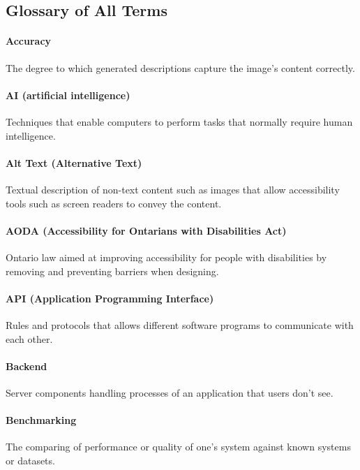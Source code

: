 \documentclass[12pt, titlepage]{article}
\begin{document}
\subsection{Glossary of All Terms}

\paragraph*{Accuracy}
The degree to which generated descriptions capture the image’s
content correctly.

\paragraph*{AI (artificial intelligence)}
Techniques that enable computers to perform tasks that normally
require human intelligence.

\paragraph*{Alt Text (Alternative Text)}
Textual description of non-text content such as images that allow
accessibility tools such as screen readers to convey the content.

\paragraph*{AODA (Accessibility for Ontarians with Disabilities Act)}
Ontario law aimed at improving accessibility for people with
disabilities by removing and preventing barriers when designing.

\paragraph*{API (Application Programming Interface)}
Rules and protocols that allows different software programs to
communicate with each other.

\paragraph*{Backend}
Server components handling processes of an application that users don't see.

\paragraph*{Benchmarking}
The comparing of performance or quality of one's system against known
systems or datasets.
\end{document}
